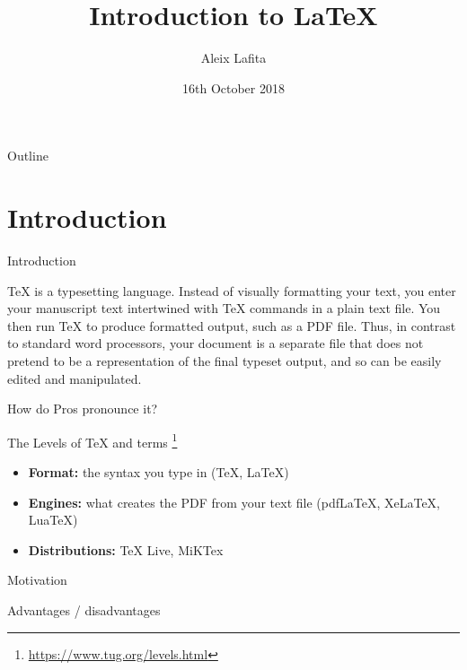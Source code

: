 \documentclass[inputenc]{beamer}
\title[Introduction to LaTeX]{Introduction to \LaTeX{}}
\author{Aleix Lafita}
\institute{Alex Bateman group (EMBL-EBI)}
\date{16th October 2018}
\begin{document}
\begin{frame}
  \titlepage
\end{frame}

\begin{frame}{Outline}
    \tableofcontents
\end{frame}

\section{Introduction}

\begin{frame}{Introduction}

TeX is a typesetting language. Instead of visually formatting your text, you enter your manuscript text intertwined with TeX commands in a plain text file. You then run TeX to produce formatted output, such as a PDF file. Thus, in contrast to standard word processors, your document is a separate file that does not pretend to be a representation of the final typeset output, and so can be easily edited and manipulated.

\end{frame}

\begin{frame}{How do Pros pronounce it?}
    
    
    
    
\end{frame}

\begin{frame}{The Levels of TeX and terms  \footnote{\url{https://www.tug.org/levels.html}}}
    
    \begin{itemize}
        \item \textbf{Format:} the syntax you type in (TeX, LaTeX)
        \item \textbf{Engines:} what creates the PDF from your text file (pdfLaTeX, XeLaTeX, LuaTeX)
        \item \textbf{Distributions:} TeX Live, MiKTex
    \end{itemize}
    
   
    
\end{frame}

\begin{frame}{Motivation}
    
    Advantages / disadvantages
    
\end{frame}
\end{document}
